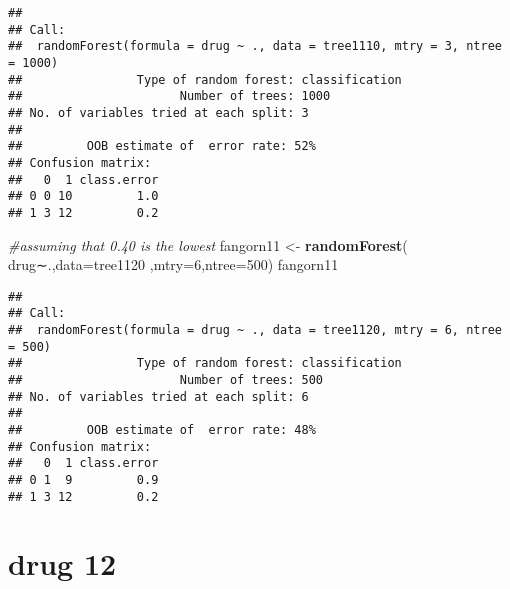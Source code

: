 \documentclass[]{article}
\newenvironment{Shaded}{\begin{snugshade}}{\end{snugshade}}
\newcommand{\KeywordTok}[1]{\textcolor[rgb]{0.13,0.29,0.53}{\textbf{#1}}}
\newcommand{\DataTypeTok}[1]{\textcolor[rgb]{0.13,0.29,0.53}{#1}}
\newcommand{\DecValTok}[1]{\textcolor[rgb]{0.00,0.00,0.81}{#1}}
\newcommand{\StringTok}[1]{\textcolor[rgb]{0.31,0.60,0.02}{#1}}
\newcommand{\CommentTok}[1]{\textcolor[rgb]{0.56,0.35,0.01}{\textit{#1}}}
\newcommand{\OperatorTok}[1]{\textcolor[rgb]{0.81,0.36,0.00}{\textbf{#1}}}
\newcommand{\NormalTok}[1]{#1}
\begin{document}
\begin{verbatim}
## 
## Call:
##  randomForest(formula = drug ~ ., data = tree1110, mtry = 3, ntree = 1000) 
##                Type of random forest: classification
##                      Number of trees: 1000
## No. of variables tried at each split: 3
## 
##         OOB estimate of  error rate: 52%
## Confusion matrix:
##   0  1 class.error
## 0 0 10         1.0
## 1 3 12         0.2
\end{verbatim}

\begin{Shaded}
\begin{Highlighting}[]
\CommentTok{#assuming that 0.40 is the lowest}
\NormalTok{fangorn11 <-}\StringTok{ }\KeywordTok{randomForest}\NormalTok{( drug∼.,}\DataTypeTok{data=}\NormalTok{tree1120  ,}\DataTypeTok{mtry=}\DecValTok{6}\NormalTok{,}\DataTypeTok{ntree=}\DecValTok{500}\NormalTok{)}
\NormalTok{fangorn11}
\end{Highlighting}
\end{Shaded}

\begin{verbatim}
## 
## Call:
##  randomForest(formula = drug ~ ., data = tree1120, mtry = 6, ntree = 500) 
##                Type of random forest: classification
##                      Number of trees: 500
## No. of variables tried at each split: 6
## 
##         OOB estimate of  error rate: 48%
## Confusion matrix:
##   0  1 class.error
## 0 1  9         0.9
## 1 3 12         0.2
\end{verbatim}

\section{drug 12}\label{drug-12}

\begin{Shaded}
\end{Shaded}
\end{document}
